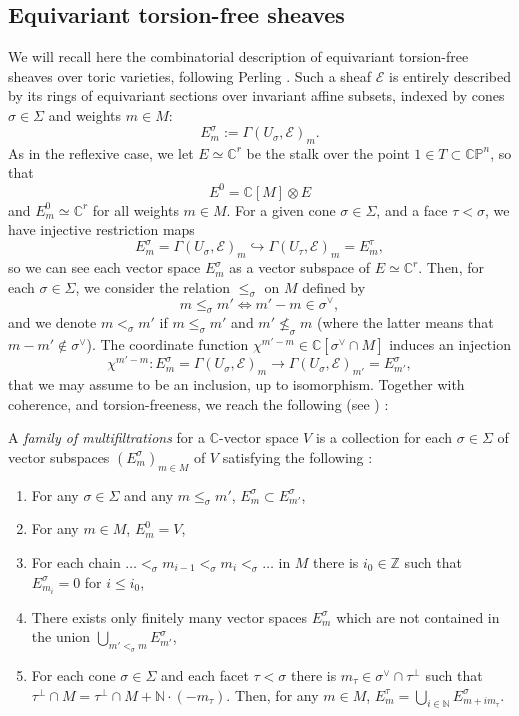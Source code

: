 \documentclass[a4paper,10pt]{amsart}
\theoremstyle{plain}{
    \newtheorem{theorem}{Theorem}[section]
    \newtheorem{lemma}[theorem]{Lemma}
    \newtheorem{corollary}[theorem]{Corollary}
    \newtheorem{proposition}[theorem]{Proposition}
    \newtheorem{conjecture}[theorem]{Conjecture}
}
\theoremstyle{definition}{
    \newtheorem{definition}[theorem]{Definition}
    \newtheorem{defn-thm}[theorem]{Definition-Theorem}
    \newtheorem{example}[theorem]{Example}
    \newtheorem{notation}[theorem]{Notation}
}
\theoremstyle{remark}{
    \newtheorem{remark}[theorem]{Remark}
    \newtheorem{problem}[theorem]{Problem}
    \newtheorem{question}[theorem]{Question}
}
\def\cE{\mathcal{E}}
\def\Z{\mathbb{Z}}
\def\N{\mathbb{N}}
\def\P{\mathbb{P}}
\def\C{\mathbb{C}}
\begin{document}
\subsection{Equivariant torsion-free sheaves}
\label{sec:torsion free and families filtrations}
We will recall here the combinatorial description of equivariant torsion-free sheaves over toric varieties, following Perling \cite[Section 5]{Per04}.  Such a sheaf $\cE$ is entirely described by its rings of equivariant sections over invariant affine subsets, indexed by cones $\sigma\in\Sigma$ and weights $m\in M$:
$$
E^\sigma_m:=\Gamma(U_\sigma,\cE)_m.
$$
As in the reflexive case, we let $E\simeq\C^r$ be the stalk over the point $1\in T\subset \C\P^n$, so that
$$
E^0=\C[M]\otimes E
$$
and $E^0_m\simeq \C^r$ for all weights $m\in M$. For a given cone $\sigma\in\Sigma$, and a face $\tau<\sigma$, we have injective restriction maps
\begin{equation}
 \label{eq:injective restrictions}
E^\sigma_m=\Gamma(U_\sigma,\cE)_m \hookrightarrow \Gamma(U_\tau,\cE)_m=E^\tau_m,
\end{equation}
so we can see each vector space $E^\sigma_m$ as a vector subspace of $E\simeq\C^r$. Then, for each $\sigma\in\Sigma$, we consider the relation $\leq_\sigma$ on $M$ defined by 
$$
m\leq_\sigma m' \Longleftrightarrow m'-m\in\sigma^\vee,
$$
and we denote $m <_\sigma m'$ if $m\leq_\sigma m'$ and $m'\nleq_\sigma m$ (where the latter means that $m-m'\notin\sigma^\vee$).
The coordinate function $\chi^{m'-m}\in\C[\sigma^\vee\cap M]$ induces an injection 
\begin{equation}
 \label{eq:injective weight multiplication}
\chi^{m'-m} : E^\sigma_m= \Gamma(U_\sigma,\cE)_m \to \Gamma(U_\sigma,\cE)_{m'}= E^\sigma_{m'},
\end{equation}
that we may assume to be an inclusion, up to isomorphism.  Together with coherence, and torsion-freeness, we reach the following (see \cite[Section 5.4]{Per04}) :
\begin{definition}
 \label{def:perling}
 A {\it family of multifiltrations} for a $\C$-vector space $V$ is a collection for each $\sigma\in\Sigma$ of vector subspaces $(E^\sigma_m)_{m\in M}$ of $V$ satisfying the following :
 \begin{enumerate}
  \item[$(i)_f$] For any $\sigma\in\Sigma$ and any $m\leq_\sigma m'$, $E^\sigma_m\subset E^\sigma_{m'}$,
  \item[$(ii)_f$] For any $m\in M$, $E^0_m=V$,
  \item[$(iii)_f$] For each chain $\ldots <_\sigma m_{i-1} <_\sigma m_i <_\sigma\ldots $ in $M$ there is $i_0\in\Z$ such that $E_{m_i}^\sigma=0$ for $i\leq i_0$,
  \item[$(iv)_f$] There exists only finitely many vector spaces $E^\sigma_m$ which are not contained in the union $\displaystyle\bigcup_{m'<_\sigma m}E^\sigma_{m'}$,
  \item[$(v)_f$] For each cone $\sigma\in\Sigma$ and each facet $\tau<\sigma$ there is $m_\tau\in \sigma^\vee\cap\tau^\perp$ such that $\tau^\perp\cap M=\tau^\perp\cap M+\N\cdot (-m_\tau)$. Then, for any $m\in M$, $E^\tau_m=\displaystyle \bigcup_{i\in\N} E^\sigma_{m+i m_\tau}$.
 \end{enumerate}
\end{definition}
\end{document}
